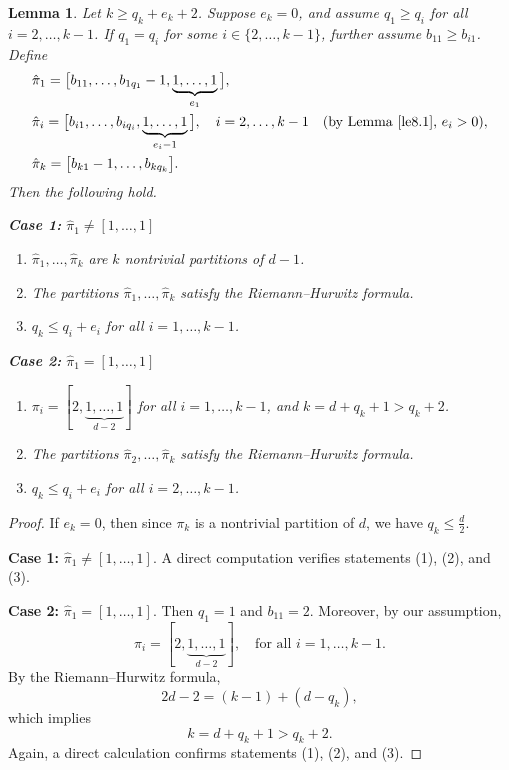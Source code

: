 \documentclass[microtype]{gtpart}     %
\newtheorem{lem}[theorem]{Lemma}          %
\theoremstyle{definition}
\begin{document}
\begin{lem}\label{le8.2}
Let \( k \geq q_k + e_k + 2 \). Suppose \( e_k = 0 \), and assume \( q_1 \geq q_i \) for all \( i = 2, \dots, k-1 \). If \( q_1 = q_i \) for some \( i \in \{2, \dots, k-1\} \), further assume \( b_{11} \geq b_{i1} \). Define
\[
\begin{aligned}
&\hat{\pi}_1 = \big[ b_{11}, \dots, b_{1q_1} - 1, \underbrace{1, \dots, 1}_{e_1} \big], \\
&\hat{\pi}_i = \big[ b_{i1}, \dots, b_{iq_i}, \underbrace{1, \dots, 1}_{e_i - 1} \big], \quad i = 2, \dots, k-1 \quad (\text{by Lemma~\ref{le8.1}, } e_i > 0), \\
&\hat{\pi}_k = \big[ b_{k1} - 1, \dots, b_{kq_k} \big].
\end{aligned}
\]
Then the following hold.

\noindent \textbf{Case 1:} \(\hat{\pi}_1 \neq [1, \dots, 1]\)
\begin{enumerate}
    \item \(\hat{\pi}_1, \dots, \hat{\pi}_k\) are \(k\) nontrivial partitions of \(d - 1\).
    \item The partitions \(\hat{\pi}_1, \dots, \hat{\pi}_k\) satisfy the Riemann--Hurwitz formula.
    \item \(q_k \leq q_i + e_i\) for all \(i = 1, \dots, k - 1\).
\end{enumerate}

\noindent \textbf{Case 2:} \(\hat{\pi}_1 = [1, \dots, 1]\)
\begin{enumerate}
    \item \(\pi_i = [2, \underbrace{1, \dots, 1}_{d - 2}]\) for all \(i = 1, \dots, k - 1\), and \(k = d + q_k + 1 > q_k + 2\).
    \item The partitions \(\hat{\pi}_2, \dots, \hat{\pi}_k\) satisfy the Riemann--Hurwitz formula.
    \item \(q_k \leq q_i + e_i\) for all \(i = 2, \dots, k - 1\).
\end{enumerate}
\end{lem}

\begin{proof}
If \( e_k = 0 \), then since \( \pi_k \) is a nontrivial partition of \( d \), we have \( q_k \leq \frac{d}{2} \).

\noindent\textbf{Case 1:} \(\hat{\pi}_1 \neq [1, \dots, 1]\). A direct computation verifies statements (1), (2), and (3).

\noindent\textbf{Case 2:} \(\hat{\pi}_1 = [1, \dots, 1]\). Then \( q_1 = 1 \) and \( b_{11} = 2 \). Moreover, by our assumption,
\[
\pi_i = [2, \underbrace{1, \dots, 1}_{d - 2}], \quad \text{for all } i = 1, \dots, k - 1.
\]
By the Riemann--Hurwitz formula,
\[
2d - 2 = (k - 1) + (d - q_k),
\]
which implies
\[
k = d + q_k + 1 > q_k + 2.
\]
Again, a direct calculation confirms statements (1), (2), and (3).
\end{proof}
\end{document}
